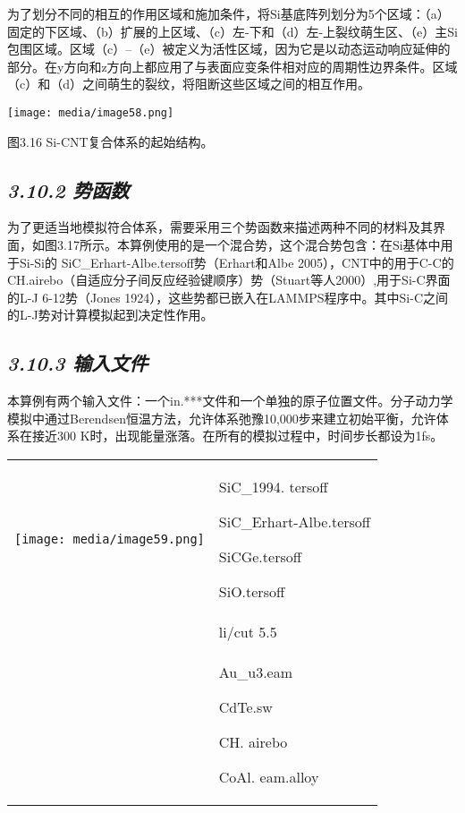 \documentclass[
]{article}
\begin{document}
为了划分不同的相互的作用区域和施加条件，将Si基底阵列划分为5个区域：（a）固定的下区域、（b）扩展的上区域、（c）左-下和（d）左-上裂纹萌生区、（e）主Si包围区域。区域（c）--（e）被定义为活性区域，因为它是以动态运动响应延伸的部分。在y方向和z方向上都应用了与表面应变条件相对应的周期性边界条件。区域（c）和（d）之间萌生的裂纹，将阻断这些区域之间的相互作用。

\texttt{[image: media/image58.png]}

图3.16 Si-CNT复合体系的起始结构。

\hypertarget{ux52bfux51fdux6570}{%
\subsection{\texorpdfstring{\emph{3.10.2
势函数}}{3.10.2 势函数}}\label{ux52bfux51fdux6570}}

为了更适当地模拟符合体系，需要采用三个势函数来描述两种不同的材料及其界面，如图3.17所示。本算例使用的是一个混合势，这个混合势包含：在Si基体中用于Si-Si的
SiC\_Erhart-Albe.tersoff势（Erhart和Albe
2005），CNT中的用于C-C的CH.airebo（自适应分子间反应经验键顺序）势（Stuart等人2000）,用于Si-C界面的L-J
6-12势（Jones
1924），这些势都已嵌入在LAMMPS程序中。其中Si-C之间的L-J势对计算模拟起到决定性作用。

\hypertarget{ux8f93ux5165ux6587ux4ef6-8}{%
\subsection{\texorpdfstring{\emph{3.10.3
输入文件}}{3.10.3 输入文件}}\label{ux8f93ux5165ux6587ux4ef6-8}}

本算例有两个输入文件：一个in.***文件和一个单独的原子位置文件。分子动力学模拟中通过Berendsen恒温方法，允许体系弛豫10,000步来建立初始平衡，允许体系在接近300
K时，出现能量涨落。在所有的模拟过程中，时间步长都设为1fs。

\begin{longtable}[]{@{}
  >{\raggedright\arraybackslash}p{}
  >{\raggedright\arraybackslash}p{}@{}}
\toprule
\endhead
\texttt{[image: media/image59.png]} &
SiC\_1994. tersoff

SiC\_Erhart-Albe.tersoff

SiCGe.tersoff

SiO.tersoff \\
& li/cut 5.5 \\
& Au\_u3.eam

CdTe.sw

CH. airebo

CoAl. eam.alloy \\
\bottomrule
\end{longtable}
\end{document}
